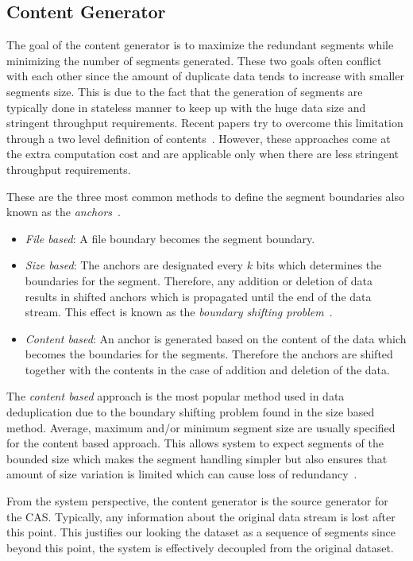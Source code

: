 \subsection{Content Generator}
The goal of the content generator is to maximize the redundant segments while minimizing the number of segments generated. 
These two goals often conflict with each other since the amount of duplicate data tends to increase with smaller segments size. 
This is due to the fact that the generation of segments are typically done in stateless manner to keep up with the huge data size and stringent throughput requirements. 
Recent papers try to overcome this limitation through a two level definition of contents~\cite{kruus:2010, bobbarjung:2006}. 
However, these approaches come at the extra computation cost and are applicable only when there are less stringent throughput requirements.

These are the three most common methods to define the segment boundaries also known as the \emph{anchors}~\cite{zhu:2008, muthitacharoen:2001}.
\begin{itemize}
	\item \emph{File based}: A file boundary becomes the segment boundary.
	\item \emph{Size based}: The anchors are designated every $k$ bits which determines the boundaries for the segment. Therefore, any addition or deletion of data results in shifted anchors which is propagated until the end of the data stream. This effect is known as the \emph{boundary shifting problem}~\cite{muthitacharoen:2001}. 
	\item \emph{Content based}: An anchor is generated based on the content of the data which becomes the boundaries for the segments. Therefore the anchors are shifted together with the contents in the case of addition and deletion of the data. 
\end{itemize}

The \emph{content based} approach is the most popular method used in data deduplication due to the boundary shifting problem found in the size based method. 
Average, maximum and/or minimum segment size are usually specified for the content based approach. This allows system to expect segments of the bounded size which makes the segment handling simpler but also ensures that amount of size variation is limited which can cause loss of redundancy~\cite{eshghi:2005}.

From the system perspective, the content generator is the source generator for the CAS. Typically, any information about the original data stream is lost after this point. This justifies our looking the dataset as a sequence of segments since beyond this point, the system is effectively decoupled from the original dataset. 

